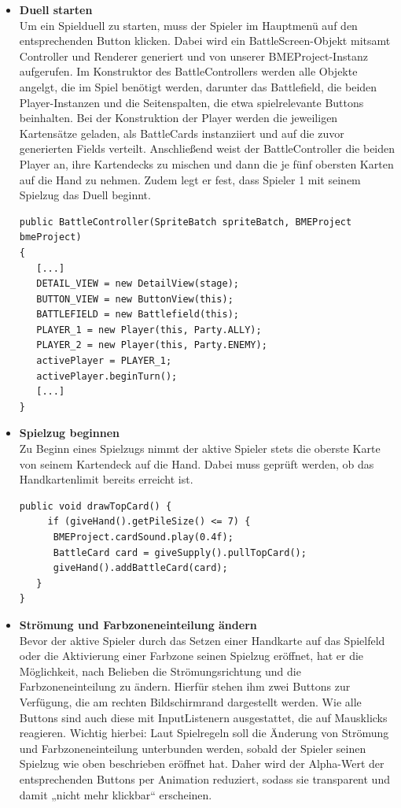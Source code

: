 \begin{itemize}
\item \textbf{Duell starten} \\
Um ein Spielduell zu starten, muss der Spieler im Hauptmenü auf den entsprechenden Button klicken. Dabei wird ein BattleScreen-Objekt mitsamt Controller und Renderer generiert und von unserer BMEProject-Instanz aufgerufen. Im Konstruktor des BattleControllers werden alle Objekte angelgt, die im Spiel benötigt werden, darunter das Battlefield, die beiden Player-Instanzen und die Seitenspalten, die etwa spielrelevante Buttons beinhalten. Bei der Konstruktion der Player werden die jeweiligen Kartensätze geladen, als BattleCards instanziiert und auf die zuvor generierten Fields verteilt. Anschließend weist der BattleController die beiden Player an, ihre Kartendecks zu mischen und dann die je fünf obersten Karten auf die Hand zu nehmen. Zudem legt er fest, dass Spieler 1 mit seinem Spielzug das Duell beginnt.

\begin{lstlisting}
public BattleController(SpriteBatch spriteBatch, BMEProject bmeProject)
{
   [...]
   DETAIL_VIEW = new DetailView(stage);
   BUTTON_VIEW = new ButtonView(this);
   BATTLEFIELD = new Battlefield(this);
   PLAYER_1 = new Player(this, Party.ALLY);
   PLAYER_2 = new Player(this, Party.ENEMY);
   activePlayer = PLAYER_1;
   activePlayer.beginTurn();
   [...]
}
\end{lstlisting}
\item \textbf{Spielzug beginnen} \\
Zu Beginn eines Spielzugs nimmt der aktive Spieler stets die oberste Karte von seinem Kartendeck auf die Hand. Dabei muss geprüft werden, ob das Handkartenlimit bereits erreicht ist.
\begin{lstlisting}
public void drawTopCard() {
     if (giveHand().getPileSize() <= 7) {
      BMEProject.cardSound.play(0.4f);
      BattleCard card = giveSupply().pullTopCard();
      giveHand().addBattleCard(card);
   }
}
\end{lstlisting}
\item \textbf{Strömung und Farbzoneneinteilung ändern} \\
Bevor der aktive Spieler durch das Setzen einer Handkarte auf das Spielfeld oder die Aktivierung einer Farbzone seinen Spielzug eröffnet, hat er die Möglichkeit, nach Belieben die Strömungsrichtung und die Farbzoneneinteilung zu ändern. Hierfür stehen ihm zwei Buttons zur Verfügung, die am rechten Bildschirmrand dargestellt werden. Wie alle Buttons sind auch diese mit InputListenern ausgestattet, die auf Mausklicks reagieren. Wichtig hierbei: Laut Spielregeln soll die Änderung von Strömung und Farbzoneneinteilung unterbunden werden, sobald der Spieler seinen Spielzug wie oben beschrieben eröffnet hat. Daher wird der Alpha-Wert der entsprechenden Buttons per Animation reduziert, sodass sie transparent und damit „nicht mehr klickbar“ erscheinen.


\end{itemize}
